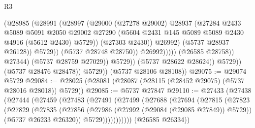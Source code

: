 \begin{lexlean}{R3}
\begin{coremodule}
                                          (@28985
                                            (@28991
                                              (@28997
                                                (@29000
                                                  (@27278 @29002)
                                                  @28937
                                                  (@27284
                                                    @2433
                                                    @5089
                                                    @5091
                                                    @2050
                                                    @29002
                                                    @27290
                                                    (@5604
                                                      @2431
                                                      @145
                                                      @5089
                                                      @5089
                                                      @2430
                                                      @4916
                                                      (@5612 @2430)
                                                      @5729))
                                                  (@27303 @2430))
                                                @26992)
                                              (@5737 @28937 @26128))
                                            @5729))
                                        (@5737 @28748 @28750))
                                      @26992)))))
                            (@26585 @28758))
                          @27344)
                        (@5737 @28759 @27029))
                      @5729))
                  (@5737 @28622 @28624))
                @5729))
            (@5737 @28476 @28478))
          @5729))
      (@5737 @28106 @28108))
@29075 := @29074 @5729
@29084 := @28025 (@28081 (@28087 (@28115 (@28452 @29075) (@5737 @28016 @28018)) @5729))
@29085 := @5737 @27847
@29110 := @27433
    (@27438
      (@27444
        (@27459
          (@27483
            (@27491
              (@27499
                (@27688
                  (@27694
                    (@27815
                      (@27823
                        (@27829
                          (@27835
                            (@27856
                              (@27986 (@27992 (@29084 (@29085 @27849)) @5729))
                              (@5737 @26233 @26320))
                            @5729)))))))))))
      (@26585 @26334))

\end{coremodule}
\end{lexlean}

